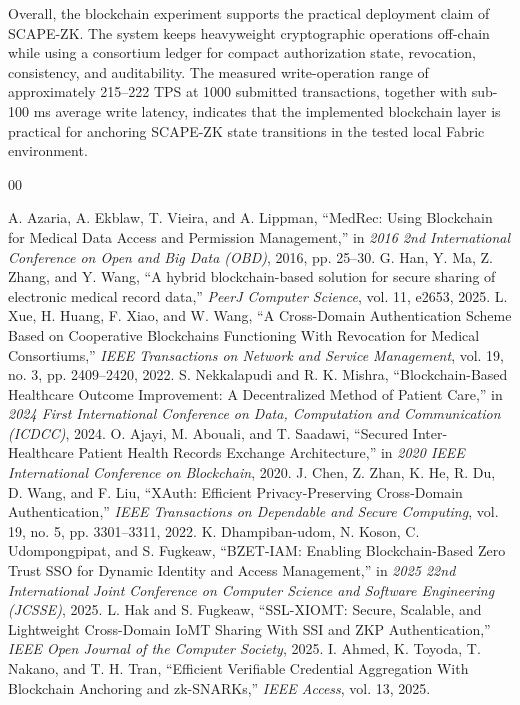 \documentclass[conference]{IEEEtran}
\begin{document}
Overall, the blockchain experiment supports the practical deployment claim of SCAPE-ZK. The system keeps heavyweight cryptographic operations off-chain while using a consortium ledger for compact authorization state, revocation, consistency, and auditability. The measured write-operation range of approximately 215--222 TPS at 1000 submitted transactions, together with sub-100 ms average write latency, indicates that the implemented blockchain layer is practical for anchoring SCAPE-ZK state transitions in the tested local Fabric environment.


\begin{thebibliography}{00}

 A. Azaria, A. Ekblaw, T. Vieira, and A. Lippman, ``MedRec: Using Blockchain for Medical Data Access and Permission Management,'' in \textit{2016 2nd International Conference on Open and Big Data (OBD)}, 2016, pp. 25--30.
 G. Han, Y. Ma, Z. Zhang, and Y. Wang, ``A hybrid blockchain-based solution for secure sharing of electronic medical record data,'' \textit{PeerJ Computer Science}, vol. 11, e2653, 2025.
 L. Xue, H. Huang, F. Xiao, and W. Wang, ``A Cross-Domain Authentication Scheme Based on Cooperative Blockchains Functioning With Revocation for Medical Consortiums,'' \textit{IEEE Transactions on Network and Service Management}, vol. 19, no. 3, pp. 2409--2420, 2022.
 S. Nekkalapudi and R. K. Mishra, ``Blockchain-Based Healthcare Outcome Improvement: A Decentralized Method of Patient Care,'' in \textit{2024 First International Conference on Data, Computation and Communication (ICDCC)}, 2024.
 O. Ajayi, M. Abouali, and T. Saadawi, ``Secured Inter-Healthcare Patient Health Records Exchange Architecture,'' in \textit{2020 IEEE International Conference on Blockchain}, 2020.
 J. Chen, Z. Zhan, K. He, R. Du, D. Wang, and F. Liu, ``XAuth: Efficient Privacy-Preserving Cross-Domain Authentication,'' \textit{IEEE Transactions on Dependable and Secure Computing}, vol. 19, no. 5, pp. 3301--3311, 2022.
 K. Dhampiban-udom, N. Koson, C. Udompongpipat, and S. Fugkeaw, ``BZET-IAM: Enabling Blockchain-Based Zero Trust SSO for Dynamic Identity and Access Management,'' in \textit{2025 22nd International Joint Conference on Computer Science and Software Engineering (JCSSE)}, 2025.
 L. Hak and S. Fugkeaw, ``SSL-XIOMT: Secure, Scalable, and Lightweight Cross-Domain IoMT Sharing With SSI and ZKP Authentication,'' \textit{IEEE Open Journal of the Computer Society}, 2025.
 I. Ahmed, K. Toyoda, T. Nakano, and T. H. Tran, ``Efficient Verifiable Credential Aggregation With Blockchain Anchoring and zk-SNARKs,'' \textit{IEEE Access}, vol. 13, 2025.

\end{thebibliography}
\end{document}
